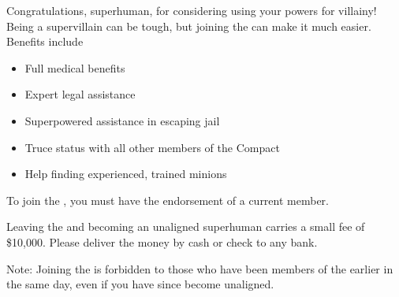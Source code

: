 \documentclass[white]{guildcamp1}
\begin{document}
\name{\wVillainRecruitment{}}

Congratulations, superhuman, for considering using your powers for villainy!  Being a supervillain can be tough, but joining the \cVillainCompact{\intro} can make it much easier.  Benefits include

\begin{itemize}
\item Full medical benefits
\item Expert legal assistance
\item Superpowered assistance in escaping jail
\item Truce status with all other members of the Compact
\item Help finding experienced, trained minions
\end{itemize}

To join the \cVillainCompact{}, you must have the endorsement of a current \cVillainCompact{} member.

Leaving the \cVillainCompact{\intro} and becoming an unaligned superhuman carries a small fee of \$10,000.  Please deliver the money by cash or check to any bank.  %

Note: Joining the \cVillainCompact{} is forbidden to those who have been members of the \cHeroLeague{\intro} earlier in the same day, even if you have since become unaligned.
\end{document}
